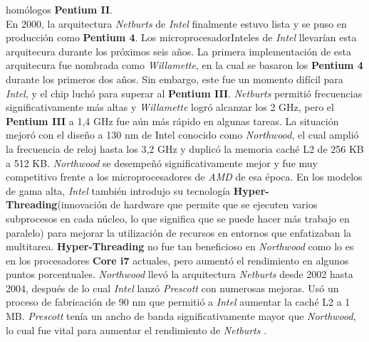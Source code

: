 homólogos \textbf{Pentium II}.\\ En 2000, la arquitectura \emph{Netburts} de \emph{Intel} finalmente estuvo lista y se puso en producción como \textbf{Pentium 4}. 
Los microprocesadorInteles de \emph{Intel} llevarían esta arquitecura durante los próximos seis años. La primera implementación de esta arquitecura fue nombrada como 
\emph{Willamette}, en la cual se basaron los \textbf{Pentium 4} durante los primeros dos años. Sin embargo, este fue un momento difícil para \emph{Intel}, y el chip luchó para 
superar al \textbf{Pentium III}. \emph{Netburts} permitió frecuencias significativamente más altas y \emph{Willamette} logró alcanzar los 2 GHz, pero el \textbf{Pentium III} 
a 1,4 GHz fue aún más rápido en algunas tareas. La situación mejoró con el diseño a 130 nm de Intel conocido como \emph{Northwood}, el cual  amplió la frecuencia 
de reloj hasta los 3,2 GHz y duplicó la memoria caché L2 de 256 KB a 512 KB. \emph{Northwood} se desempeñó significativamente mejor y fue muy competitivo frente a los microprocesadores 
de \emph{AMD} de esa época.
En los modelos de gama alta, \emph{Intel} también introdujo su tecnología \textbf{Hyper-Threading}(innovación de hardware que permite que se ejecuten varios subprocesos en cada núcleo, 
lo que significa que se puede hacer más trabajo en paralelo) para mejorar la utilización de recursos en entornos que 
enfatizaban la multitarea. \textbf{Hyper-Threading} no fue tan beneficioso en \emph{Northwood} como lo es en los procesadores \textbf{Core i7} actuales, 
pero aumentó el rendimiento en algunos puntos porcentuales.
\emph{Northwood} llevó la arquitectura \emph{Netburts} desde 2002 hasta 2004, después de lo cual \emph{Intel} lanzó \emph{Prescott} con numerosas mejoras. 
Usó un proceso de fabricación de 90 nm que permitió a \emph{Intel} aumentar la caché L2 a 1 MB.  \emph{Prescott} tenía un ancho de banda significativamente mayor que \emph{Northwood}, 
lo cual fue vital para aumentar el rendimiento de \emph{Netburts} .




